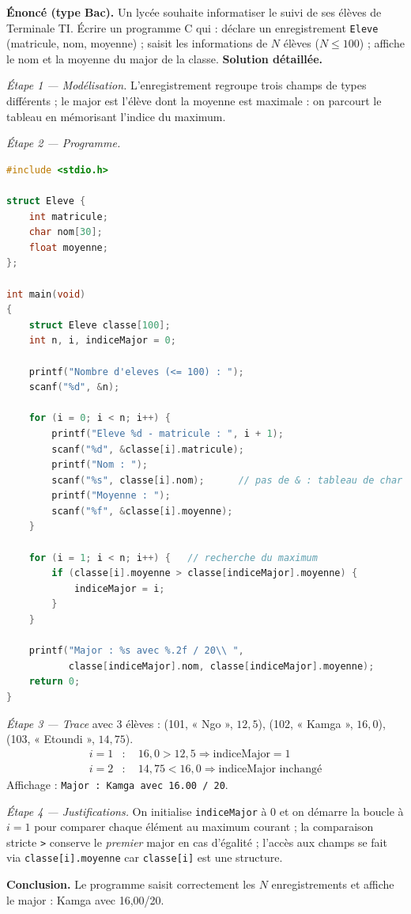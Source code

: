 \documentclass[11pt]{article}
\begin{document}
\begin{exoresolu}
\textbf{Énoncé (type Bac).} Un lycée souhaite informatiser le suivi de ses élèves de Terminale TI. Écrire un programme C qui : déclare un enregistrement \texttt{Eleve} (matricule, nom, moyenne) ; saisit les informations de $N$ élèves ($N \leq 100$) ; affiche le nom et la moyenne du major de la classe.
\tcblower
\textbf{Solution détaillée.}

\emph{Étape 1 — Modélisation.} L'enregistrement regroupe trois champs de types différents ; le major est l'élève dont la moyenne est maximale : on parcourt le tableau en mémorisant l'indice du maximum.

\emph{Étape 2 — Programme.}
\begin{lstlisting}[language=C]
#include <stdio.h>

struct Eleve {
    int matricule;
    char nom[30];
    float moyenne;
};

int main(void)
{
    struct Eleve classe[100];
    int n, i, indiceMajor = 0;

    printf("Nombre d'eleves (<= 100) : ");
    scanf("%d", &n);

    for (i = 0; i < n; i++) {
        printf("Eleve %d - matricule : ", i + 1);
        scanf("%d", &classe[i].matricule);
        printf("Nom : ");
        scanf("%s", classe[i].nom);      // pas de & : tableau de char
        printf("Moyenne : ");
        scanf("%f", &classe[i].moyenne);
    }

    for (i = 1; i < n; i++) {   // recherche du maximum
        if (classe[i].moyenne > classe[indiceMajor].moyenne) {
            indiceMajor = i;
        }
    }

    printf("Major : %s avec %.2f / 20\\ ",
           classe[indiceMajor].nom, classe[indiceMajor].moyenne);
    return 0;
}
\end{lstlisting}

\emph{Étape 3 — Trace} avec 3 élèves : (101, « Ngo », $12{,}5$), (102, « Kamga », $16{,}0$), (103, « Etoundi », $14{,}75$).
\begin{align*}
i = 1 &: \quad 16{,}0 > 12{,}5 \Rightarrow \text{indiceMajor} = 1\\
i = 2 &: \quad 14{,}75 < 16{,}0 \Rightarrow \text{indiceMajor inchangé}
\end{align*}
Affichage : \texttt{Major : Kamga avec 16.00 / 20}.

\emph{Étape 4 — Justifications.} On initialise \texttt{indiceMajor} à 0 et on démarre la boucle à $i = 1$ pour comparer chaque élément au maximum courant ; la comparaison stricte \texttt{>} conserve le \emph{premier} major en cas d'égalité ; l'accès aux champs se fait via \texttt{classe[i].moyenne} car \texttt{classe[i]} est une structure.

\textbf{Conclusion.} Le programme saisit correctement les $N$ enregistrements et affiche le major : Kamga avec 16,00/20.
\end{exoresolu}
\end{document}
